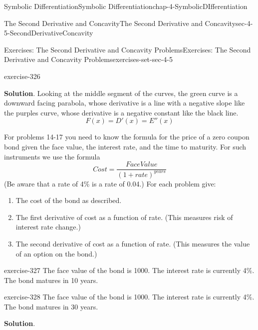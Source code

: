 \documentclass[oneside,10pt,]{book}
\numberwithin{equation}{section}
\begin{document}
\begin{chapterptx}{Symbolic Differentiation}{}{Symbolic Differentiation}{}{}{chap-4-SymbolicDIfferentiation}
\begin{sectionptx}{The Second Derivative and Concavity}{}{The Second Derivative and Concavity}{}{}{sec-4-5-SecondDerivativeConcavity}
\begin{exercises-subsection-numberless}{Exercises: The Second Derivative and Concavity Problems}{}{Exercises: The Second Derivative and Concavity Problems}{}{}{exercises-set-sec-4-5}
\begin{exercisegroup}
\begin{divisionexerciseeg}{13}{}{}{exercise-326}
%
\par\smallskip%
\noindent\textbf{Solution}.\hypertarget{solution-163}{}\quad%
\hypertarget{p-1849}{}%
Looking at the middle segment of the curves, the green curve is a downward facing parabola, whose derivative is a line with a negative slope like the purples curve, whose derivative is a negative constant like the black line.%
%
\begin{equation*}
F(x) = D'(x)=E''(x)
\end{equation*}
\end{divisionexerciseeg}%
\end{exercisegroup}
\par\medskip\noindent
\par\medskip\noindent%
\hypertarget{exercisegroup-23}{}%
\hypertarget{p-1850}{}%
For problems 14-17 you need to know the formula for the price of a zero coupon bond given the face value, the interest rate, and the time to maturity.  For such instruments we use the formula%
%
\begin{equation*}
Cost=\frac{FaceValue}{(1+rate)^{years}}
\end{equation*}
\hypertarget{p-1851}{}%
(Be aware that a rate of 4\% is a rate of 0.04.) For each problem give:%
\leavevmode%
\begin{enumerate}[label=(\alph*)]
\item\hypertarget{li-558}{}\hypertarget{p-1852}{}%
The cost of the bond as described.%
\item\hypertarget{li-559}{}\hypertarget{p-1853}{}%
The first derivative of cost as a function of rate. (This measures risk of interest rate change.)%
\item\hypertarget{li-560}{}\hypertarget{p-1854}{}%
The second derivative of cost as a function of rate.  (This measures the value of an option on the bond.)%
\end{enumerate}
\begin{exercisegroup}
\begin{divisionexerciseeg}{14}{}{}{exercise-327}%
\hypertarget{p-1855}{}%
The face value of the bond is \textdollar{}1000.  The interest rate is currently 4\%.  The bond matures in 10 years.%
\end{divisionexerciseeg}%
\begin{divisionexerciseeg}{15}{}{}{exercise-328}%
\hypertarget{p-1856}{}%
The face value of the bond is \textdollar{}1000.  The interest rate is currently 4\%.  The bond matures in 30 years.%
\par\smallskip%
\noindent\textbf{Solution}.\hypertarget{solution-164}{}\quad%

\end{divisionexerciseeg}
\end{exercisegroup}
\end{exercises-subsection-numberless}
\end{sectionptx}
\end{chapterptx}
\end{document}
